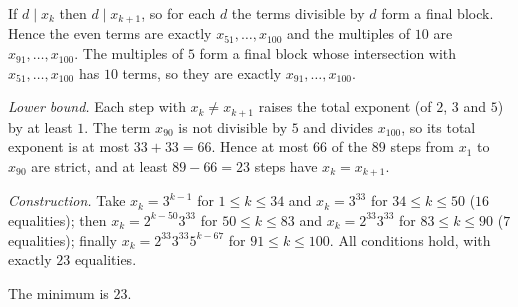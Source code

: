 If $d\mid x_k$ then $d\mid x_{k+1}$, so for each $d$ the terms divisible by $d$ form a final block. Hence the even terms are exactly $x_{51},\dots,x_{100}$ and the multiples of $10$ are $x_{91},\dots,x_{100}$. The multiples of $5$ form a final block whose intersection with $x_{51},\dots,x_{100}$ has $10$ terms, so they are exactly $x_{91},\dots,x_{100}$.

\emph{Lower bound.} Each step with $x_k\ne x_{k+1}$ raises the total exponent (of $2$, $3$ and $5$) by at least $1$. The term $x_{90}$ is not divisible by $5$ and divides $x_{100}$, so its total exponent is at most $33+33=66$. Hence at most $66$ of the $89$ steps from $x_1$ to $x_{90}$ are strict, and at least $89-66=23$ steps have $x_k=x_{k+1}$.

\emph{Construction.} Take $x_k=3^{k-1}$ for $1\le k\le34$ and $x_k=3^{33}$ for $34\le k\le50$ ($16$ equalities); then $x_k=2^{k-50}3^{33}$ for $50\le k\le83$ and $x_k=2^{33}3^{33}$ for $83\le k\le90$ ($7$ equalities); finally $x_k=2^{33}3^{33}5^{k-67}$ for $91\le k\le100$. All conditions hold, with exactly $23$ equalities.

The minimum is $\boxed{23}$.
